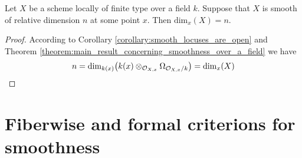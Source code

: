 \begin{corollary}\label{corollary:relative_smooth_dimension_is_local_dimension}
Let $X$ be a scheme locally of finite type over a field $k$. Suppose that $X$ is smooth of relative dimension $n$ at some point $x$. Then $\mathrm{dim}_x(X)=n$.
\end{corollary}
\begin{proof}
According to Corollary \ref{corollary:smooth_locuses_are_open} and Theorem \ref{theorem:main_result_concerning_smoothness_over_a_field} we have
$$n = \mathrm{dim}_{k(x)}\big(k(x)\otimes_{{\mathcal O}_{X,x}}\Omega_{{\mathcal O}_{X,x}/k}\big) = \mathrm{dim}_x(X)$$
\end{proof}

\section{Fiberwise and formal criterions for smoothness}

